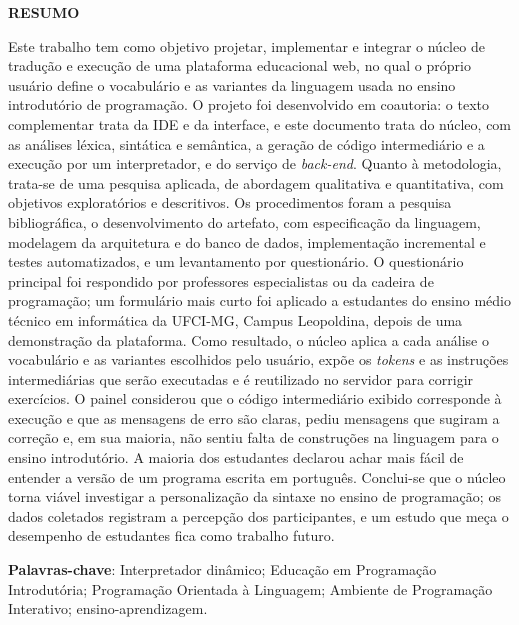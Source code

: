\documentclass[
        oneside,      %
        english,			
        brazil			 
        ]{configcefetmglpd}
\begin{document}

\begin{resumo_cefetmg}
	
\begin{center}
    \textbf{RESUMO} 
\end{center}


\noindent Este trabalho tem como objetivo projetar, implementar e integrar o núcleo de tradução e execução de uma plataforma educacional web, no qual o próprio usuário define o vocabulário e as variantes da linguagem usada no ensino introdutório de programação. O projeto foi desenvolvido em coautoria: o texto complementar trata da IDE e da interface, e este documento trata do núcleo, com as análises léxica, sintática e semântica, a geração de código intermediário e a execução por um interpretador, e do serviço de \textit{back-end}. Quanto à metodologia, trata-se de uma pesquisa aplicada, de abordagem qualitativa e quantitativa, com objetivos exploratórios e descritivos. Os procedimentos foram a pesquisa bibliográfica, o desenvolvimento do artefato, com especificação da linguagem, modelagem da arquitetura e do banco de dados, implementação incremental e testes automatizados, e um levantamento por questionário. O questionário principal foi respondido por professores especialistas ou da cadeira de programação; um formulário mais curto foi aplicado a estudantes do ensino médio técnico em informática da UFCI-MG, Campus Leopoldina, depois de uma demonstração da plataforma. Como resultado, o núcleo aplica a cada análise o vocabulário e as variantes escolhidos pelo usuário, expõe os \textit{tokens} e as instruções intermediárias que serão executadas e é reutilizado no servidor para corrigir exercícios. O painel considerou que o código intermediário exibido corresponde à execução e que as mensagens de erro são claras, pediu mensagens que sugiram a correção e, em sua maioria, não sentiu falta de construções na linguagem para o ensino introdutório. A maioria dos estudantes declarou achar mais fácil de entender a versão de um programa escrita em português. Conclui-se que o núcleo torna viável investigar a personalização da sintaxe no ensino de programação; os dados coletados registram a percepção dos participantes, e um estudo que meça o desempenho de estudantes fica como trabalho futuro.


\noindent
\textbf{Palavras-chave}: Interpretador dinâmico; Educação em Programação Introdutória; Programação Orientada à Linguagem; Ambiente de Programação Interativo; ensino-aprendizagem.

\end{resumo_cefetmg}
 
\end{document}
